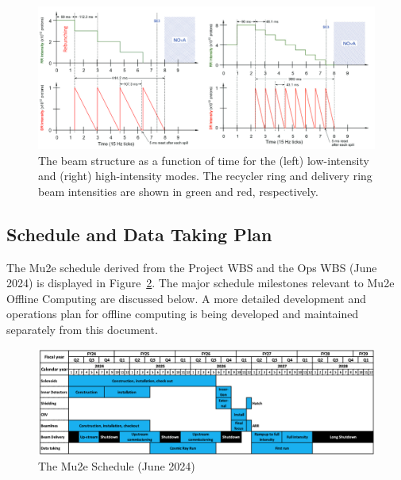 %
\begin{figure}[ht!]
\begin{center}
\includegraphics[width=0.9\linewidth]{figures/BeamStructure.png}
\caption{The beam structure as a function of time for the (left) low-intensity and (right) high-intensity modes. The recycler ring and delivery ring beam intensities are shown in green and red, respectively.}
\label{fig:beam}
\end{center}
\end{figure}

\subsection{Schedule and Data Taking Plan}
The Mu2e schedule derived from the Project WBS and the Ops WBS (June 2024) is displayed in Figure~\ref{fig:Mu2eRunPlan}. The major schedule milestones relevant to Mu2e Offline Computing are discussed below. A more detailed development and operations plan for offline computing is being developed and maintained separately from this document.
%
\begin{figure}[ht!]
\begin{center}
\includegraphics[width=0.9\linewidth]{figures/Mu2eTimeline2.png}
\caption{The Mu2e Schedule (June 2024)}
\label{fig:Mu2eRunPlan}
\end{center}
\end{figure}
%
